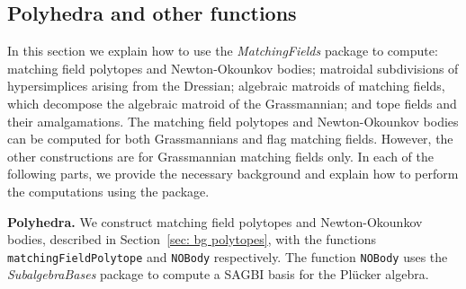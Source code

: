 \documentclass[11pt]{article}
\theoremstyle{plain}
\theoremstyle{definition}
\theoremstyle{remark}
\begin{document}
\subsection{Polyhedra and other functions}\label{sec: other functions}

In this section we explain how to use the \textit{MatchingFields} package to compute: matching field polytopes and Newton-Okounkov bodies; matroidal subdivisions of hypersimplices arising from the Dressian; algebraic matroids of matching fields, which decompose the algebraic matroid of the Grassmannian; and tope fields and their amalgamations. The matching field polytopes and Newton-Okounkov bodies can be computed for both Grassmannians and flag matching fields. However, the other constructions are for Grassmannian matching fields only. In each of the following parts, we provide the necessary background and explain how to perform the computations using the package.











\medskip
\noindent \textbf{Polyhedra.}
We construct matching field polytopes and Newton-Okounkov bodies, described in Section~\ref{sec: bg polytopes}, with the functions \texttt{matchingFieldPolytope} and \texttt{NOBody} respectively. The function \texttt{NOBody} uses the \textit{SubalgebraBases} package to compute a SAGBI basis for the Pl\"ucker algebra.
\end{document}
